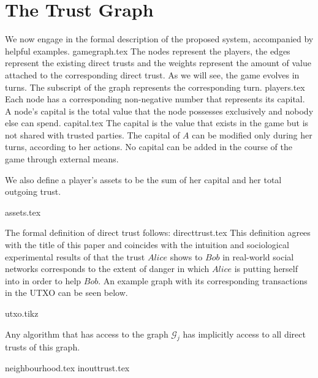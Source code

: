 \section{The Trust Graph}
  We now engage in the formal description of the proposed system, accompanied by helpful examples.
  {gamegraph.tex}
  The nodes represent the players, the edges represent the existing direct trusts and the weights represent the amount of
  value attached to the corresponding direct trust. As we will see, the game evolves in turns. The subscript of the graph
  represents the corresponding turn.
  {players.tex}
  Each node has a corresponding non-negative number that represents its capital. A node's capital is the total value that
  the node possesses exclusively and nobody else can spend.
  {capital.tex}
  The capital is the value that exists in the game but is not shared with trusted parties. The capital of $A$ can be
  modified only during her turns, according to her actions. No capital can be added in the course of the game through
  external means.

  We also define a player's assets to be the sum of her capital and her total outgoing trust.

  {assets.tex}

  The formal definition of direct trust follows:
  {directtrust.tex}
  This definition agrees with the title of this paper and coincides with the intuition and sociological experimental results
  of \cite{kmrs} that the trust $Alice$ shows to $Bob$ in real-world social networks corresponds to the extent of danger in
  which $Alice$ is putting herself into in order to help $Bob$. An example graph with its corresponding transactions in the
  UTXO can be seen below.

  {utxo.tikz}

  Any algorithm that has access to the graph $\mathcal{G}_j$ has implicitly access to all direct trusts of this graph.

  {neighbourhood.tex}
  {inouttrust.tex}
